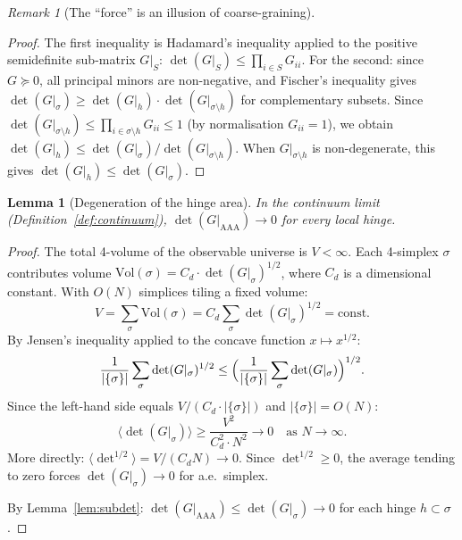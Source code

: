\documentclass[12pt]{article}
\newtheorem{lemma}[theorem]{Lemma}
\theoremstyle{remark}
\newtheorem{remark}[theorem]{Remark}
\theoremstyle{definition}
\begin{document}
\begin{remark}[The ``force'' is an illusion of coarse-graining]
\begin{proof}
The first inequality is Hadamard's inequality applied to the positive
semidefinite sub-matrix $G|_S$: $\det(G|_S) \leq \prod_{i \in S} G_{ii}$.
For the second: since $G \succeq 0$, all principal minors are
non-negative, and Fischer's inequality gives
$\det(G|_\sigma) \geq \det(G|_h) \cdot \det(G|_{\sigma \setminus h})$
for complementary subsets.  Since
$\det(G|_{\sigma \setminus h}) \leq \prod_{i \in \sigma \setminus h}
G_{ii} \leq 1$ (by normalisation $G_{ii} = 1$), we obtain
$\det(G|_h) \leq \det(G|_\sigma) / \det(G|_{\sigma \setminus h})$.
When $G|_{\sigma \setminus h}$ is non-degenerate, this gives
$\det(G|_h) \leq \det(G|_\sigma)$.
\end{proof}

\begin{lemma}[Degeneration of the hinge area]
\label{lem:degen}
In the continuum limit (Definition~\ref{def:continuum}),
$\det(G|_{\mathrm{AAA}}) \to 0$ for every local hinge.
\end{lemma}

\begin{proof}
The total 4-volume of the observable universe is $V < \infty$.  Each
4-simplex $\sigma$ contributes volume
$\mathrm{Vol}(\sigma) = C_d \cdot \det(G|_\sigma)^{1/2}$, where $C_d$
is a dimensional constant.  With $O(N)$ simplices tiling a fixed volume:
\begin{equation}
V = \sum_\sigma \mathrm{Vol}(\sigma)
  = C_d \sum_\sigma \det(G|_\sigma)^{1/2}
  = \mathrm{const}.
\end{equation}
By Jensen's inequality applied to the concave function $x \mapsto x^{1/2}$:
\begin{equation}
\frac{1}{|\{\sigma\}|} \sum_\sigma \det(G|_\sigma)^{1/2}
\leq \Bigl(\frac{1}{|\{\sigma\}|} \sum_\sigma \det(G|_\sigma)\Bigr)^{1/2}.
\end{equation}
Since the left-hand side equals $V / (C_d \cdot |\{\sigma\}|)$
and $|\{\sigma\}| = O(N)$:
\begin{equation}
\langle \det(G|_\sigma) \rangle \geq \frac{V^2}{C_d^2 \cdot N^2}
\to 0 \quad \text{as } N \to \infty.
\end{equation}
More directly: $\langle \det^{1/2} \rangle = V / (C_d N) \to 0$.
Since $\det^{1/2} \geq 0$, the average tending to zero forces
$\det(G|_\sigma) \to 0$ for a.e.\ simplex.

By Lemma~\ref{lem:subdet}: $\det(G|_{\mathrm{AAA}}) \leq
\det(G|_\sigma) \to 0$ for each hinge $h \subset \sigma$.
\end{proof}


\end{remark}
\end{document}
